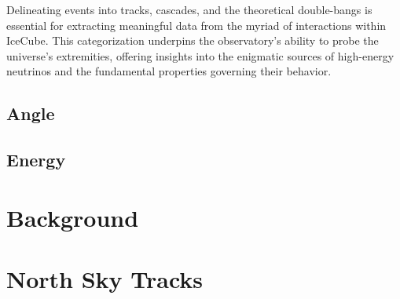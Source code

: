 Delineating events into tracks, cascades, and the theoretical double-bangs is essential for extracting meaningful data from the myriad of interactions within IceCube.
This categorization underpins the observatory's ability to probe the universe's extremities, offering insights into the enigmatic sources of high-energy neutrinos and the fundamental properties governing their behavior.

\subsection{Angle}

\subsection{Energy}

\section{Background}

\section{North Sky Tracks}
